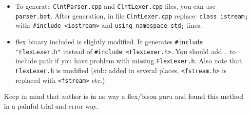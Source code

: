 \begin{itemize}
\item To generate \verb+ClntParser.cpp+ and \verb+ClntLexer.cpp+ files, you can use
\verb+parser.bat+. After generation, in file \verb+ClntLexer.cpp+ replace: \verb+class istream;+
with: \verb+#include <iostream>+ and \verb+using namespace std;+ lines.
\item flex binary included is slightly modified. It generates
\verb+#include "FlexLexer.h"+ instead of \verb+#include <FlexLexer.h>+. You should
add .\ to include path if you have problem with missing \verb+FlexLexer.h+.
Also note that \verb+FlexLexer.h+ is modified (std:: added in several places,
\verb+<fstream.h>+ is replaced with \verb+<fstream>+ etc.)
\end{itemize}

Keep in mind that author is in no way a flex/bison guru and found this method
in a painful trial-and-error way. 
